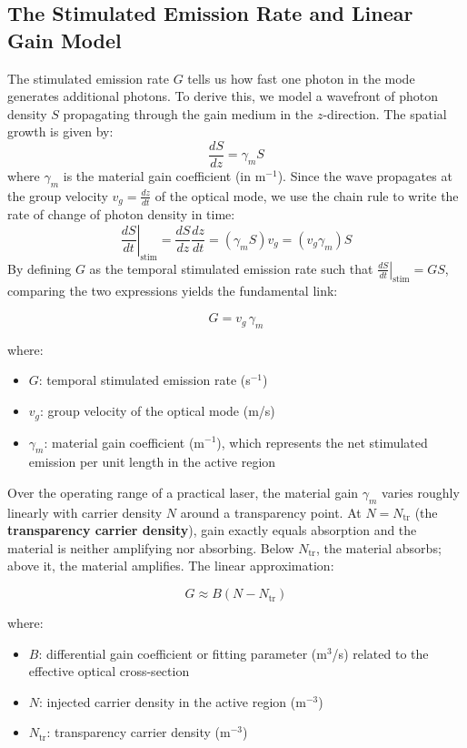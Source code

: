 \subsection{The Stimulated Emission Rate and Linear Gain Model}

The stimulated emission rate $G$ tells us how fast one photon in the mode generates additional photons. To derive this, we model a wavefront of photon density $S$ propagating through the gain medium in the $z$-direction. The spatial growth is given by:
\begin{equation*}
    \frac{dS}{dz} = \gamma_m S
\end{equation*}
where $\gamma_m$ is the material gain coefficient (in $\text{m}^{-1}$). Since the wave propagates at the group velocity $v_g = \frac{dz}{dt}$ of the optical mode, we use the chain rule to write the rate of change of photon density in time:
\begin{equation*}
    \left.\frac{dS}{dt}\right|_{\text{stim}} = \frac{dS}{dz} \frac{dz}{dt} = (\gamma_m S) v_g = (v_g \gamma_m) S
\end{equation*}
By defining $G$ as the temporal stimulated emission rate such that $\left.\frac{dS}{dt}\right|_{\text{stim}} = G S$, comparing the two expressions yields the fundamental link:
\begin{keyresult}
    \begin{equation}
        G = v_g\,\gamma_m
    \end{equation}
\end{keyresult}
where:
\begin{itemize}
    \item $G$: temporal stimulated emission rate (s$^{-1}$)
    \item $v_g$: group velocity of the optical mode (m/s)
    \item $\gamma_m$: material gain coefficient (m$^{-1}$), which represents the net stimulated emission per unit length in the active region
\end{itemize}

Over the operating range of a practical laser, the material gain $\gamma_m$ varies roughly linearly with carrier density $N$ around a transparency point. At $N = N_\text{tr}$ (the \textbf{transparency carrier density}), gain exactly equals absorption and the material is neither amplifying nor absorbing. Below $N_\text{tr}$, the material absorbs; above it, the material amplifies. The linear approximation:
\begin{keyresult}
    \begin{equation}
        G \approx B(N - N_\text{tr})
    \end{equation}
\end{keyresult}
where:
\begin{itemize}
    \item $B$: differential gain coefficient or fitting parameter (m$^3$/s) related to the effective optical cross-section
    \item $N$: injected carrier density in the active region (m$^{-3}$)
    \item $N_{\text{tr}}$: transparency carrier density (m$^{-3}$)
\end{itemize}

